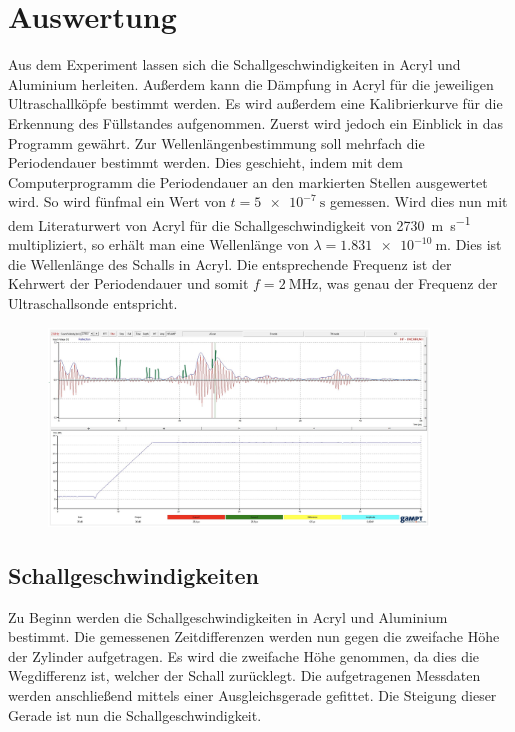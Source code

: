 %

%
\section{Auswertung}
\label{sec:Auswertung}

Aus dem Experiment lassen sich die Schallgeschwindigkeiten in Acryl und Aluminium herleiten. Außerdem kann die 
Dämpfung in Acryl für die jeweiligen Ultraschallköpfe bestimmt werden. Es wird außerdem eine Kalibrierkurve für 
die Erkennung des Füllstandes aufgenommen.
Zuerst wird jedoch ein Einblick in das Programm gewährt. Zur Wellenlängenbestimmung soll mehrfach die Periodendauer 
bestimmt werden. Dies geschieht, indem mit dem Computerprogramm die Periodendauer an den markierten Stellen 
ausgewertet wird. So wird fünfmal ein Wert von $t = \qty{5e-7}{\second}$ gemessen. Wird dies nun mit dem 
Literaturwert von Acryl für die Schallgeschwindigkeit von \qty{2730}{\meter \per \second} multipliziert, so erhält 
man eine Wellenlänge von $\lambda = \qty{1.831e-10}{\meter}$. Dies ist die Wellenlänge des Schalls in Acryl. Die entsprechende 
Frequenz ist der Kehrwert der Periodendauer und somit $f=\qty{2}{\mega\hertz}$, was genau der Frequenz der 
Ultraschallsonde entspricht.
\begin{figure}
    \centering
    \includegraphics[width=0.9\textwidth]{content/PC.png}
\end{figure}

\subsection{Schallgeschwindigkeiten}
Zu Beginn werden die Schallgeschwindigkeiten in Acryl und Aluminium bestimmt. Die gemessenen Zeitdifferenzen 
werden nun gegen die zweifache Höhe der Zylinder aufgetragen. Es wird die zweifache Höhe genommen, da dies die 
Wegdifferenz ist, welcher der Schall zurücklegt. Die aufgetragenen Messdaten werden anschließend mittels einer 
Ausgleichsgerade gefittet. Die Steigung dieser Gerade ist nun die Schallgeschwindigkeit.\\

